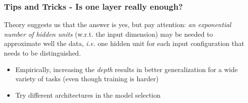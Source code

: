 \documentclass{beamer}
\begin{document}
	\begin{frame}
		\frametitle{Tips and Tricks - Is one layer really enough?}
		Theory suggests us that the answer is yes, but pay attention: \textit{an exponential number of hidden units} (w.r.t. the input dimension) may be needed to approximate well the data, \textit{i.e.} one hidden unit for each input configuration that needs to be distinguished.
		
		\vspace{5mm}
		\begin{itemize}
			\item Empirically, increasing the \textit{depth} results in better generalization for a wide variety of tasks (even though training is harder)
			\item Try different architectures in the model selection
		\end{itemize}
		
	\end{frame}
\end{document}
